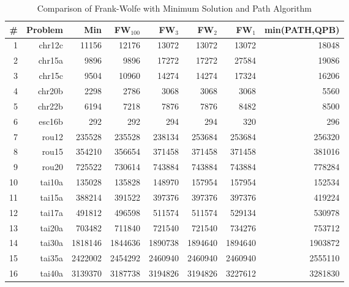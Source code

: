 \documentclass{article} %
\begin{document}
\begin{table}[h!]
\caption{Comparison of Frank-Wolfe with Minimum Solution and Path Algorithm}
\begin{center}
\begin{tabular}{|r|r|r||r|r|r|r|r|}
\hline
\# & Problem  &   Min    & FW$_{100}$&FW$_{3}$&FW$_{2}$&FW$_{1}$& min(PATH,QPB)\\
\hline
1&    chr12c &   11156 &   12176 &   13072 &   13072 &   13072 &   18048\\
2&    chr15a &    9896 &    9896 &   17272 &   17272 &   27584 &   19086\\
3&    chr15c &    9504 &   10960 &   14274 &   14274 &   17324 &   16206\\
4&   chr20b &    2298 &    2786 &    3068 &    3068 &    3068 &    5560\\
5&    chr22b &    6194 &    7218 &    7876 &    7876 &    8482 &    8500\\
6&    esc16b &     292 &     292 &     294 &     294 &     320 &     296\\
7&     rou12 &  235528 &  235528 &  238134 &  253684 &  253684 &  256320\\
8&     rou15 &  354210 &  356654 &  371458 &  371458 &  371458 &  381016\\
9&     rou20 &  725522 &  730614 &  743884 &  743884 &  743884 &  778284\\
10&    tai10a &  135028 &  135828 &  148970 &  157954 &  157954 &  152534\\
11&    tai15a &  388214 &  391522 &  397376 &  397376 &  397376 &  419224\\
12&    tai17a &  491812 &  496598 &  511574 &  511574 &  529134 &  530978\\
13&    tai20a &  703482 &  711840 &  721540 &  721540 &  734276 &  753712\\
14&    tai30a & 1818146 & 1844636 & 1890738 & 1894640 & 1894640 & 1903872\\
15&    tai35a & 2422002 & 2454292 & 2460940 & 2460940 & 2460940 & 2555110\\
16&    tai40a & 3139370 & 3187738 & 3194826 & 3194826 & 3227612 & 3281830\\
    \hline
\end{tabular}
\end{center}
\label{tab:fwpath}
\end{table}%
\end{document}
